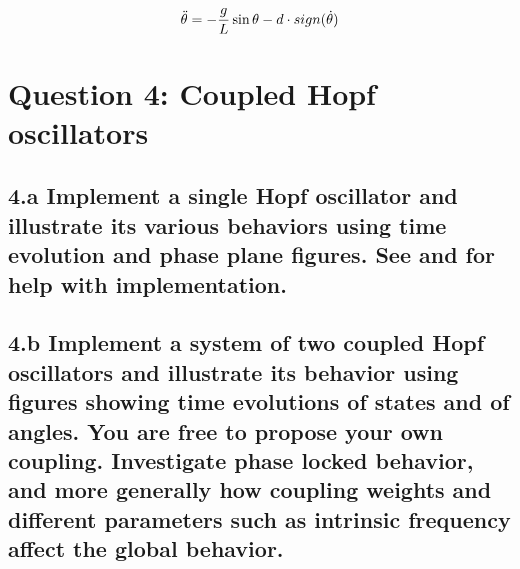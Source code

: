 \documentclass{cmc}
\begin{document}
\begin{equation}
  \label{eq:ode-pendulum-dry}
  \ddot{\theta} = - {g \over L} \sin \theta - d \cdot sign(\dot{\theta})
\end{equation}


\section*{Question 4: Coupled Hopf oscillators}

\subsection*{4.a Implement a single Hopf oscillator and illustrate its various
  behaviors using time evolution and phase plane figures. See
   and  for help with implementation.}


\subsection*{4.b Implement a system of two coupled Hopf oscillators and
  illustrate its behavior using figures showing time evolutions of states and of
  angles. You are free to propose your own coupling.  Investigate phase locked
  behavior, and more generally how coupling weights and different parameters
  such as intrinsic frequency affect the global behavior.}
\end{document}
